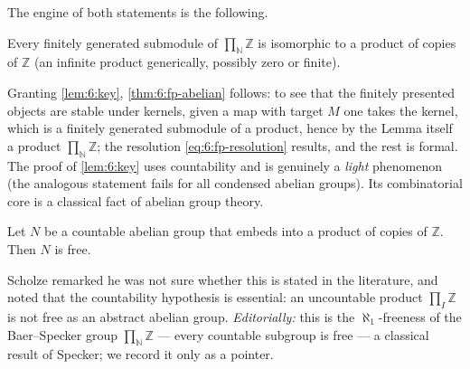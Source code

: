The engine of both statements is the following.

\begin{lemma}
\label{lem:6:key}
Every finitely generated submodule of $\prod_{\mathbb{N}}\mathbb{Z}$ is isomorphic
to a product of copies of $\mathbb{Z}$ (an infinite product generically, possibly
zero or finite).
\end{lemma}

Granting \cref{lem:6:key}, \cref{thm:6:fp-abelian} follows: to see that the
finitely presented objects are stable under kernels, given a map with target $M$
one takes the kernel, which is a finitely generated submodule of a product, hence
by the Lemma itself a product $\prod_{\mathbb{N}}\mathbb{Z}$; the resolution
\eqref{eq:6:fp-resolution} results, and the rest is formal. The proof of
\cref{lem:6:key} uses countability and is genuinely a \emph{light} phenomenon
(the analogous statement fails for all condensed abelian groups). Its
combinatorial core is a classical fact of abelian group theory.

\begin{lemma}
\label{lem:6:free-fact}
Let $N$ be a countable abelian group that embeds into a product of copies of
$\mathbb{Z}$. Then $N$ is free.
\end{lemma}

\begin{remark}
\label{rmk:6:baer-specker}
Scholze remarked he was not sure whether this is stated in the literature, and
noted that the countability hypothesis is essential: an uncountable product
$\prod_{I}\mathbb{Z}$ is not free as an abstract abelian group.
\emph{Editorially:} this is the $\aleph_{1}$-freeness of the Baer--Specker group
$\prod_{\mathbb{N}}\mathbb{Z}$ --- every countable subgroup is free --- a classical
result of Specker; we record it only as a pointer.
\end{remark}

